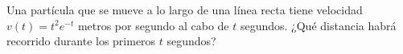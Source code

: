 \item Una partícula que se mueve a lo largo de una línea recta tiene velocidad $v(t) = t^2 e^{-t}$ metros por segundo al cabo de $t$ segundos. ¿Qué distancia habrá recorrido durante los primeros $t$ segundos?
